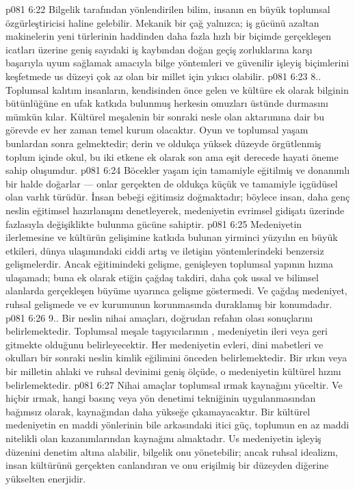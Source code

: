 \vs p081 6:22 Bilgelik tarafından yönlendirilen bilim, insanın en büyük toplumsal özgürleştiricisi haline gelebilir. Mekanik bir çağ yalnızca; iş gücünü azaltan makinelerin yeni türlerinin haddinden daha fazla hızlı bir biçimde gerçekleşen icatları üzerine geniş sayıdaki iş kaybından doğan geçiş zorluklarına karşı başarıyla uyum sağlamak amacıyla bilge yöntemleri ve güvenilir işleyiş biçimlerini keşfetmede us düzeyi çok az olan bir millet için yıkıcı olabilir.
\vs p081 6:23 8.\bibnobreakspace {}. Toplumsal kalıtım insanların, kendisinden önce gelen ve kültüre ek olarak bilginin bütünlüğüne en ufak katkıda bulunmuş herkesin omuzları üstünde durmasını mümkün kılar. Kültürel meşalenin bir sonraki nesle olan aktarımına dair bu görevde ev her zaman temel kurum olacaktır. Oyun ve toplumsal yaşam bunlardan sonra gelmektedir; derin ve oldukça yüksek düzeyde örgütlenmiş toplum içinde okul, bu iki etkene ek olarak son ama eşit derecede hayati öneme sahip oluşumdur.
\vs p081 6:24 Böcekler yaşam için tamamiyle eğitilmiş ve donanımlı bir halde doğarlar --- onlar gerçekten de oldukça küçük ve tamamiyle içgüdüsel olan varlık türüdür. İnsan bebeği eğitimsiz doğmaktadır; böylece insan, daha genç neslin eğitimsel hazırlanışını denetleyerek, medeniyetin evrimsel gidişatı üzerinde fazlasıyla değişiklikte bulunma gücüne sahiptir.
\vs p081 6:25 Medeniyetin ilerlemesine ve kültürün gelişimine katkıda bulunan yirminci yüzyılın en büyük etkileri, dünya ulaşımındaki ciddi artış ve iletişim yöntemlerindeki benzersiz gelişmelerdir. Ancak eğitimindeki gelişme, genişleyen toplumsal yapının hızına ulaşamadı; buna ek olarak etiğin çağdaş takdiri, daha çok ussal ve bilimsel alanlarda gerçekleşen büyüme uyarınca gelişme göstermedi. Ve çağdaş medeniyet, ruhsal gelişmede ve ev kurumunun korunmasında duraklamış bir konumdadır.
\vs p081 6:26 9.\bibnobreakspace {}. Bir neslin nihai amaçları, doğrudan refahın olası sonuçlarını belirlemektedir. Toplumsal meşale taşıyıcılarının , medeniyetin ileri veya geri gitmekte olduğunu belirleyecektir. Her medeniyetin evleri, dini mabetleri ve okulları bir sonraki neslin kimlik eğilimini önceden belirlemektedir. Bir ırkın veya bir milletin ahlaki ve ruhsal devinimi geniş ölçüde, o medeniyetin kültürel hızını belirlemektedir.
\vs p081 6:27 Nihai amaçlar toplumsal ırmak kaynağını yüceltir. Ve hiçbir ırmak, hangi basınç veya yön denetimi tekniğinin uygulanmasından bağımsız olarak, kaynağından daha yükseğe çıkamayacaktır. Bir kültürel medeniyetin en maddi yönlerinin bile arkasındaki itici güç, toplumun en az maddi nitelikli olan kazanımlarından kaynağını almaktadır. Us medeniyetin işleyiş düzenini denetim altına alabilir, bilgelik onu yönetebilir; ancak ruhsal idealizm, insan kültürünü gerçekten canlandıran ve onu erişilmiş bir düzeyden diğerine yükselten enerjidir.

